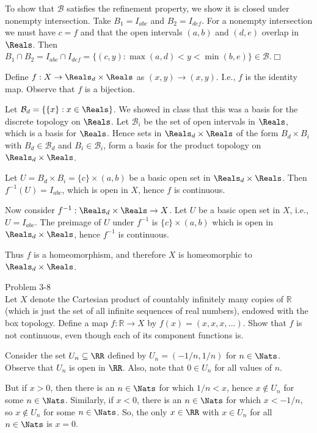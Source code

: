 \documentclass{homework651}
\newcommand\nextprob{\newpage}
\begin{document}
\begin{aproblems}
To show that $\mathcal{B}$ satisfies the refinement property, we show it
is closed under nonempty intersection.  Take
$B_1=I_{abc}$ and $B_2=I_{def}$.  For a nonempty intersection we must
have $c=f$ and that the open intervals $(a,b)$ and $(d,e)$ overlap in $\Reals$.
Then
$B_1\cap B_2=I_{abc}\cap I_{def}=
  \{(c,y):\max(a,d)<y<\min(b,e)\}\in\mathcal{B}$.\hfill$\Box$

\solution
Define $f:X\rightarrow \Reals_d\times\Reals$ as $(x,y)\rightarrow(x,y)$.
I.e., $f$ is the identity map.  Observe that $f$ is a bijection.

Let $\mathcal{B}_d = \{\{x\}:x\in\Reals\}$.  We showed in class that this
was a basis for the discrete topology on $\Reals$.  Let $\mathcal{B}_i$
be the set of open intervals in $\Reals$, which is a basis for $\Reals$.
Hence sets in $\Reals_d\times\Reals$ of the form
$B_d\times B_i$ with $B_d\in\mathcal{B}_d$ and $B_i\in\mathcal{B}_i$,
form a basis for the product topology on $\Reals_d\times\Reals$.

Let $U=B_d\times B_i=\{c\}\times(a,b)$ be a basic open set in
$\Reals_d\times\Reals$.  Then $f^{-1}(U)=I_{abc}$, which is open in $X$,
hence $f$ is continuous.

Now consider $f^{-1}:\Reals_d\times\Reals\rightarrow X$.  Let $U$ be a basic
open set in $X$, i.e., $U=I_{abc}$.  The preimage of $U$ under $f^{-1}$ is
$\{c\}\times(a,b)$ which is open in $\Reals_d\times\Reals$, hence $f^{-1}$
is continuous.

Thus $f$ is a homeomorphism, and therefore $X$ is homeomorphic to $\Reals_d\times\Reals$.

\nextprob
\hproblem Problem 3-8\\
Let $X$ denote the Cartesian product of countably infinitely many copies of
$\mathbb{R}$ (which is just the set of all infinite sequences of real numbers),
endowed with the box topology.  Define a map $f:\mathbb{R}\rightarrow X$
by $f(x)=(x,x,x,...)$.  Show that $f$ is not continuous, even though each of
its component functions is.

\solution
Consider the set $U_n\subseteq \RR$ defined by $U_n=(-1/n,1/n)$ for $n\in\Nats$.
Observe that $U_n$ is open in $\RR$.
Also, note that $0\in U_n$ for all values of $n$.

But if $x>0$, then there is an $n\in\Nats$ for which $1/n<x$, hence
$x\not\in U_n$ for some $n\in\Nats$.  Similarly, if $x<0$, there is
an $n\in\Nats$ for which $x<-1/n$, so $x\not\in U_n$ for some $n\in\Nats$.
So, the only $x\in\RR$ with $x\in U_n$ for all $n\in\Nats$ is $x=0$.


\end{aproblems}
\end{document}
